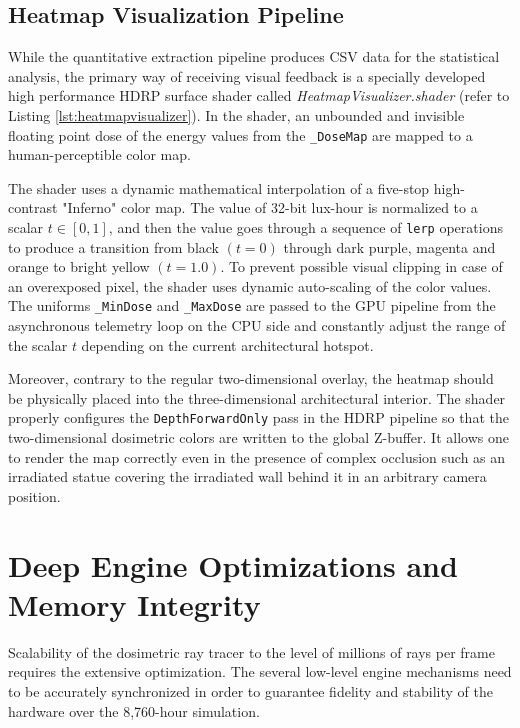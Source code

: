\subsection{Heatmap Visualization Pipeline}

While the quantitative extraction pipeline produces CSV data for the statistical analysis, the primary way of receiving visual feedback is a specially developed high performance HDRP surface shader called \textit{HeatmapVisualizer.shader} (refer to Listing \ref{lst:heatmapvisualizer}). In the shader, an unbounded and invisible floating point dose of the energy values from the \texttt{\_DoseMap} are mapped to a human-perceptible color map.

The shader uses a dynamic mathematical interpolation of a five-stop high-contrast "Inferno" color map. The value of 32-bit lux-hour is normalized to a scalar \( t \in [0, 1] \), and then the value goes through a sequence of \texttt{lerp} operations to produce a transition from black \( (t = 0) \) through dark purple, magenta and orange to bright yellow \( (t = 1.0) \). To prevent possible visual clipping in case of an overexposed pixel, the shader uses dynamic auto-scaling of the color values. The uniforms \texttt{\_MinDose} and \texttt{\_MaxDose} are passed to the GPU pipeline from the asynchronous telemetry loop on the CPU side and constantly adjust the range of the scalar \( t \) depending on the current architectural hotspot.

Moreover, contrary to the regular two-dimensional overlay, the heatmap should be physically placed into the three-dimensional architectural interior. The shader properly configures the \texttt{DepthForwardOnly} pass in the HDRP pipeline so that the two-dimensional dosimetric colors are written to the global Z-buffer. It allows one to render the map correctly even in the presence of complex occlusion such as an irradiated statue covering the irradiated wall behind it in an arbitrary camera position.

\section{Deep Engine Optimizations and Memory Integrity}

Scalability of the dosimetric ray tracer to the level of millions of rays per frame requires the extensive optimization. The several low-level engine mechanisms need to be accurately synchronized in order to guarantee fidelity and stability of the hardware over the 8,760-hour simulation.

